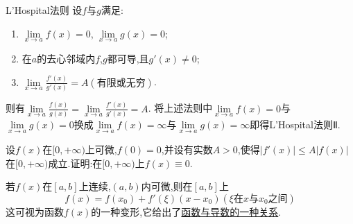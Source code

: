 \begin{theorem}{L'Hospital法则}
	\label{thm:L'Hospital_Law}
	设$f$与$g$满足:
	\begin{enumerate}
		\item $\lim\limits_{x\rightarrow a}f\left( x \right) =0$, $\lim\limits_{x\rightarrow a}g\left( x \right) =0$;
		\item 在$a$的去心邻域内$f$,$g$都可导,且$g'\left( x \right) \ne 0$;
		\item $\lim\limits_{x\rightarrow a}\frac{f'\left( x \right)}{g'\left( x \right)}=A\left( \text{有限或无穷} \right) $.
	\end{enumerate}
	则有$\lim\limits_{x\rightarrow a}\frac{f\left( x \right)}{g\left( x \right)}=\lim\limits_{x\rightarrow a}\frac{f'\left( x \right)}{g'\left( x \right)}=A$.
	将上述法则中$\lim\limits_{x\rightarrow a}f\left( x \right) =0$与$\lim\limits_{x\rightarrow a}g\left( x \right) =0$换成$\lim\limits_{x\rightarrow a}f\left( x \right) =\infty $与$\lim\limits_{x\rightarrow a}g\left( x \right) =\infty $即得L'Hospital法则Ⅱ.
\end{theorem}

\begin{example}
	设$f(x)$在$[0, +\infty)$上可微,$f(0)=0$,并设有实数$A>0$,使得$| f'(x) | \le A |f(x)|$在$[0, +\infty)$成立.证明:在$[0, +\infty)$上$f(x)\equiv 0$.
\end{example}

\begin{note}
	若$f(x)$在$[a,b]$上连续,$(a,b)$内可微,则在$[a,b]$上
	$$
		f\left( x \right) =f\left( x_0 \right) +f'\left( \xi \right) \left( x-x_0 \right) \left( \xi \text{在}x\text{与}x_0\text{之间} \right)
	$$
	这可视为函数$f(x)$的一种变形,它给出了\underline{函数与导数的一种关系}.
	\vspace{7cm}
\end{note}
